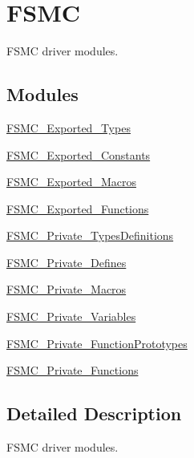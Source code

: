 \hypertarget{group___f_s_m_c}{}\section{F\+S\+MC}
\label{group___f_s_m_c}


F\+S\+MC driver modules.  


\subsection*{Modules}
\begin{DoxyCompactItemize}
\item 
\mbox{\hyperlink{group___f_s_m_c___exported___types}{F\+S\+M\+C\+\_\+\+Exported\+\_\+\+Types}}
\item 
\mbox{\hyperlink{group___f_s_m_c___exported___constants}{F\+S\+M\+C\+\_\+\+Exported\+\_\+\+Constants}}
\item 
\mbox{\hyperlink{group___f_s_m_c___exported___macros}{F\+S\+M\+C\+\_\+\+Exported\+\_\+\+Macros}}
\item 
\mbox{\hyperlink{group___f_s_m_c___exported___functions}{F\+S\+M\+C\+\_\+\+Exported\+\_\+\+Functions}}
\item 
\mbox{\hyperlink{group___f_s_m_c___private___types_definitions}{F\+S\+M\+C\+\_\+\+Private\+\_\+\+Types\+Definitions}}
\item 
\mbox{\hyperlink{group___f_s_m_c___private___defines}{F\+S\+M\+C\+\_\+\+Private\+\_\+\+Defines}}
\item 
\mbox{\hyperlink{group___f_s_m_c___private___macros}{F\+S\+M\+C\+\_\+\+Private\+\_\+\+Macros}}
\item 
\mbox{\hyperlink{group___f_s_m_c___private___variables}{F\+S\+M\+C\+\_\+\+Private\+\_\+\+Variables}}
\item 
\mbox{\hyperlink{group___f_s_m_c___private___function_prototypes}{F\+S\+M\+C\+\_\+\+Private\+\_\+\+Function\+Prototypes}}
\item 
\mbox{\hyperlink{group___f_s_m_c___private___functions}{F\+S\+M\+C\+\_\+\+Private\+\_\+\+Functions}}
\end{DoxyCompactItemize}


\subsection{Detailed Description}
F\+S\+MC driver modules. 

